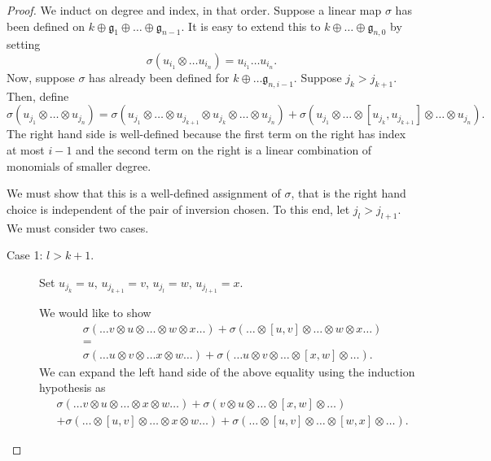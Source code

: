 \documentclass[12pt]{article}
\theoremstyle{thmstyle}
\theoremstyle{defstyle}
\newcommand{\frakg}{\mathfrak{g}}
\begin{document}
\begin{proof}
    We induct on degree and index, in that order. Suppose a linear map $\sigma$ has been defined on $k\oplus\frakg_1\oplus\dots\oplus\frakg_{n - 1}$. It is easy to extend this to $k\oplus\dots\oplus\frakg_{n, 0}$ by setting 
    \begin{equation*}
        \sigma(u_{i_1}\otimes\dots u_{i_n}) = u_{i_1}\dots u_{i_n}.
    \end{equation*}
    Now, suppose $\sigma$ has already been defined for $k\oplus\dots\frakg_{n, i - 1}$. Suppose $j_k > j_{k + 1}$. Then, define 
    \begin{equation*}
        \sigma(u_{j_1}\otimes\dots\otimes u_{j_n}) = \sigma(u_{j_1}\otimes\dots\otimes u_{j_{k + 1}}\otimes u_{j_k}\otimes\dots\otimes u_{j_n}) + \sigma(u_{j_1}\otimes\dots\otimes[u_{j_k}, u_{j_{k + 1}}]\otimes\dots\otimes u_{j_n}).
    \end{equation*}
    The right hand side is well-defined because the first term on the right has index at most $i - 1$ and the second term on the right is a linear combination of monomials of smaller degree.

    We must show that this is a well-defined assignment of $\sigma$, that is the right hand choice is independent of the pair of inversion chosen. To this end, let $j_l > j_{l + 1}$. We must consider two cases. 

    \begin{description}
    \item[Case 1: $l > k + 1$.] Set $u_{j_k} = u$, $u_{j_{k + 1}} = v$, $u_{j_l} = w$, $u_{j_{l + 1}} = x$.

    We would like to show 
    \begin{align*}
        &\sigma(\dots v\otimes u\otimes\dots\otimes w\otimes x\dots) + \sigma(\dots\otimes[u,v]\otimes\dots\otimes w\otimes x\dots)\\
        &= \\
        &\sigma(\dots u\otimes v\otimes\dots x\otimes w\dots) + \sigma(\dots u\otimes v\otimes\dots\otimes [x, w]\otimes\dots).
    \end{align*}
    We can expand the left hand side of the above equality using the induction hypothesis as 
    \begin{align*}
        &\sigma(\dots v\otimes u\otimes \dots \otimes x\otimes w\dots) + \sigma(v\otimes u\otimes \dots \otimes [x, w]\otimes\dots)\\
        &+ \sigma(\dots\otimes [u,v]\otimes\dots\otimes x\otimes w\dots) + \sigma(\dots\otimes [u, v]\otimes\dots\otimes [w,x]\otimes\dots).
    \end{align*}


\end{description}
\end{proof}
\end{document}
